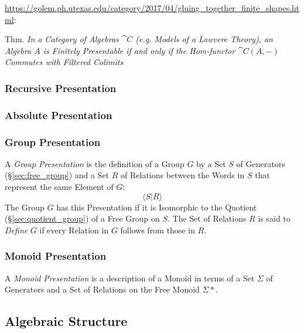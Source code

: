 \url{https://golem.ph.utexas.edu/category/2017/04/gluing_together_finite_shapes.html}:

Thm. \emph{In a Category of Algebras $\cat{C}$ (e.g. Models of a
  Lawvere Theory), an Algebra $A$ is Finitely Presentable if and only
  if the Hom-functor $\cat{C}(A,-)$ Commutes with Filtered Colimits}



\subsubsection{Recursive Presentation}\label{sec:recursive_presentation}

\subsubsection{Absolute Presentation}\label{sec:absolute_presentation}

\subsubsection{Group Presentation}\label{sec:group_presentation}

A \emph{Group Presentation} is the definition of a Group $G$ by a Set $S$ of
Generators (\S\ref{sec:free_group}) and a Set $R$ of Relations between the Words
in $S$ that represent the same Element of $G$:
\[
  \langle S | R \rangle
\]
The Group $G$ has this Presentation if it is Isomorphic to the Quotient
(\S\ref{sec:quotient_group}) of a Free Group on $S$. The Set of Relations $R$ is
said to \emph{Define} $G$ if every Relation in $G$ follows from those in $R$.



\subsubsection{Monoid Presentation}\label{sec:monoid_presentation}

A \emph{Monoid Presentation} is a description of a Monoid in terms of a Set
$\Sigma$ of Generators and a Set of Relations on the Free Monoid $\Sigma*$.



\subsection{Algebraic Structure}\label{sec:algebraic_structure}

